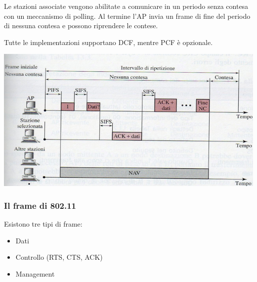             Le stazioni associate vengono abilitate a comunicare in un periodo senza contesa con un meccanismo di polling. Al termine l'AP invia un frame di fine del periodo di nessuna contesa e possono riprendere le contese.

            Tutte le implementazioni supportano DCF, mentre PCF è opzionale.

            \begin{center}
                \includegraphics[scale=0.5]{chapters/3/assets/schema_x.png}
            \end{center}

        \subsubsection{Il frame di 802.11}
            Esistono tre tipi di frame:
            \begin{itemize}
                \item Dati
                \item Controllo (RTS, CTS, ACK)
                \item Management
            \end{itemize}

